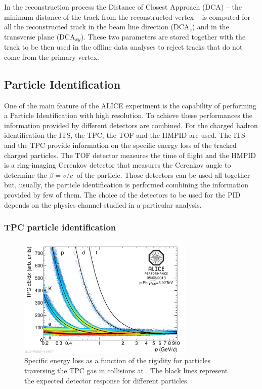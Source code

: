 In the reconstruction process the Distance of Closest Approach (DCA) -- the minimum 
distance of the track from the reconstructed vertex -- is computed for all the reconstructed
track in the beam line direction (DCA$_{z}$) and in the transverse plane (DCA$_{xy}$).
These two parameters are stored together with the track to be then used in the offline data analyses to reject tracks that do not come from the 
primary vertex.

%
\subsection{Particle Identification} \label{sec:PID}

One of the main feature of the ALICE experiment is the capability of performing a Particle Identification with high
resolution. To achieve these performances the information provided by different detectors are combined.
For the charged hadron identification the ITS, the TPC, the TOF and the HMPID are used.
The ITS and the TPC provide information on the specific energy loss of the tracked charged particles.
The TOF detector measures the time of flight and the HMPID is a ring-imaging Cerenkov detector that
measures the Cerenkov angle to determine the $\beta = v / c\ $ of the particle.
Those detectors can be used all together but, usually, the particle identification is performed
combining the information provided by few of them.
The choice of the detectors to be used for the PID depends on the physics channel studied in a particular analysis.

\subsubsection{TPC particle identification} \label{sec:TPC_PID}

\begin{figure} 
    \centering
    \includegraphics[width=0.75\textwidth]{gfx/pid_tpc_gen}
	\caption{Specific energy loss as a function of the rigidity for particles traversing the TPC gas in \pPb collisions at \sctev. The black lines represent the expected detector response for different particles.}
	\label{fig:pid_tpc}
\end{figure}

